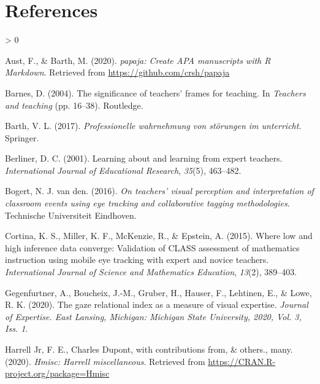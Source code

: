\documentclass[
  english,
  man,floatsintext]{apa6}
\newlength{\cslhangindent}
\newenvironment{CSLReferences}[2] %
 {%
  \setlength{\parindent}{0pt}
  \ifodd #1 \everypar{\setlength{\hangindent}{\cslhangindent}}\ignorespaces\fi
  \ifnum #2 > 0
  \setlength{\parskip}{#2\baselineskip}
  \fi
 }%
 {}
\begin{document}
\newpage

\hypertarget{references}{%
\section{References}\label{references}}

\begingroup
\setlength{\parindent}{-0.5in}
\setlength{\leftskip}{0.5in}

\hypertarget{refs}{}
\begin{CSLReferences}{1}{0}
\leavevmode\hypertarget{ref-R-papaja}{}%
Aust, F., \& Barth, M. (2020). \emph{{papaja}: {Create} {APA} manuscripts with {R Markdown}}. Retrieved from \url{https://github.com/crsh/papaja}

\leavevmode\hypertarget{ref-barnes2004significance}{}%
Barnes, D. (2004). The significance of teachers' frames for teaching. In \emph{Teachers and teaching} (pp. 16--38). Routledge.

\leavevmode\hypertarget{ref-barth2017professionelle}{}%
Barth, V. L. (2017). \emph{Professionelle wahrnehmung von störungen im unterricht}. Springer.

\leavevmode\hypertarget{ref-berliner2001learning}{}%
Berliner, D. C. (2001). Learning about and learning from expert teachers. \emph{International Journal of Educational Research}, \emph{35}(5), 463--482.

\leavevmode\hypertarget{ref-bogert2016visualperception}{}%
Bogert, N. J. van den. (2016). \emph{On teachers' visual perception and interpretation of classroom events using eye tracking and collaborative tagging methodologies}. Technische Universiteit Eindhoven.

\leavevmode\hypertarget{ref-cortina2015low}{}%
Cortina, K. S., Miller, K. F., McKenzie, R., \& Epstein, A. (2015). Where low and high inference data converge: Validation of CLASS assessment of mathematics instruction using mobile eye tracking with expert and novice teachers. \emph{International Journal of Science and Mathematics Education}, \emph{13}(2), 389--403.

\leavevmode\hypertarget{ref-gegenfurtner2020gaze}{}%
Gegenfurtner, A., Boucheix, J.-M., Gruber, H., Hauser, F., Lehtinen, E., \& Lowe, R. K. (2020). The gaze relational index as a measure of visual expertise. \emph{Journal of Expertise. East Lansing, Michigan: Michigan State University, 2020, Vol. 3, Iss. 1}.

\leavevmode\hypertarget{ref-R-Hmisc}{}%
Harrell Jr, F. E., Charles Dupont, with contributions from, \& others., many. (2020). \emph{Hmisc: Harrell miscellaneous}. Retrieved from \url{https://CRAN.R-project.org/package=Hmisc}


\end{CSLReferences}
\end{document}
